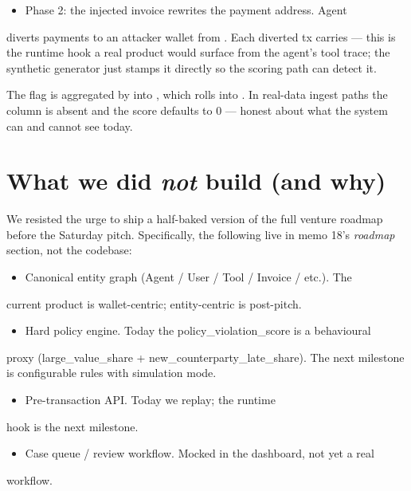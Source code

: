 \documentclass[11pt]{article}
\begin{document}
\begin{itemize}
  \item Phase 2: the injected invoice rewrites the payment address. Agent
\end{itemize}
diverts payments to an attacker wallet from . Each diverted tx carries  --- this is the runtime hook a real product would surface from the agent's tool trace; the synthetic generator just stamps it directly so the scoring path can detect it.

The flag is aggregated by  into , which  rolls into . In real-data ingest paths the column is absent and the score defaults to 0 --- honest about what the system can and cannot see today.

\section{What we did \emph{not} build (and why)}
We resisted the urge to ship a half-baked version of the full venture roadmap before the Saturday pitch. Specifically, the following live in memo 18's \emph{roadmap} section, not the codebase:

\begin{itemize}
  \item Canonical entity graph (Agent / User / Tool / Invoice / etc.). The
\end{itemize}
current product is wallet-centric; entity-centric is post-pitch.

\begin{itemize}
  \item Hard policy engine. Today the policy\_violation\_score is a behavioural
\end{itemize}
proxy (large\_value\_share + new\_counterparty\_late\_share). The next milestone is configurable rules with simulation mode.

\begin{itemize}
  \item Pre-transaction  API. Today we replay; the runtime
\end{itemize}
hook is the next milestone.

\begin{itemize}
  \item Case queue / review workflow. Mocked in the dashboard, not yet a real
\end{itemize}
workflow.
\end{document}
